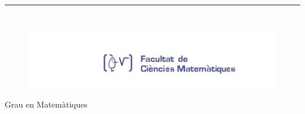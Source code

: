 \begin{titlepage}
\begin{center}
    \vspace*{0.5in}
    
    \rule{110mm}{0.1mm}\\
    
    
    \hspace{-3cm}
    \begin{minipage}[t]{.45\textwidth}
    \raggedleft
    \begin{figure}[H]
    
    \includegraphics[width=15cm]{LogoFac.jpeg}
    \end{figure}
    \end{minipage}
    \hfill
    \noindent
    \begin{minipage}[t]{.45\textwidth}
    \raggedleft
    
    \vspace{2cm}
    \hspace{-1cm}
    \begin{Large}
    Grau en Matem\`atiques\\
    \end{Large}
    \end{minipage}
    \end{center}
    \end{titlepage}